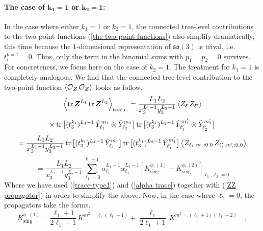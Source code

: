 \paragraph[The case of $k_1 = 1$ or $k_2 = 1$]{The case of $\mathbf{k_1 = 1}$ or $\mathbf{k_2 = 1}$:}
In the case where either $k_1 = 1$ or $k_2 = 1$, the connected tree-level contributions to the two-point functions (\ref{the two-point functions}) also simplify dramatically, this time because the $1$-dimensional representation of $\mathfrak{so}(3)$ is trival, i.e. $t_i^{k=1} = 0$. Thus, only the term in the binomial sums with $p_1 = p_2 = 0$ survives. For concreteness, we focus here on the case of $k_2=1$. The treatment for $k_1=1$ is completely analogous. We find that the connected tree-level contribution to the two-point function $\expval{\mathcal{O}_{\boldsymbol{Z}} \, \mathcal{O}_{\boldsymbol{Z}}}$ looks as follow.
%
%
\begin{equation*}
\expval{\tr \boldsymbol{Z}^{L_1} \tr \boldsymbol{Z}^{L_2}}_{\mathrm{tree,c.}}
=
\frac{L_1 L_2}{x_3^{L_1-1} y_3^{L_2-1}}
\expval{
Z_{\boldsymbol{\ell}} \,
Z_{\boldsymbol{\ell}'}
}
\end{equation*}
%
%
\begin{equation*}
\times
\tr \big[ (t_3^{k_1})^{L_1 - 1} \, \hat{Y}_{\ell_1}^{m_1} \otimes \hat{Y}_{\ell_2}^{m_2} \big] 
\tr \big[ (t_3^{k_1})^{L_2 - 1} \, \hat{Y}_{\ell_1'}^{m_1'} \otimes \hat{Y}_{\ell_2'}^{m_2'} \big]
\end{equation*}
%
%
\begin{equation*}
= \frac{L_1 L_2}{x_3^{L_1-1} y_3^{L_2-1}}
\tr \big[ (t_3^{k_1})^{L_1 - 1} \, \hat{Y}_{\ell_1}^{m_1} \big] 
\tr \big[ (t_3^{k_1})^{L_2 - 1} \, \hat{Y}_{\ell_1'}^{m_1'} \big]
\expval{
Z_{\ell_1,m_1;0,0} \,
Z_{\ell_1',m_1';0,0}
}
\end{equation*}
%
%
\begin{equation}\label{two-point function so(3)}
= \frac{L_1 L_2}{x_3^{L_1-1} y_3^{L_2-1}}
\sum_{\ell_1 = 0}^{k_1 - 1}
\alpha_{\ell_1}^{L_1 - 1}
\alpha_{\ell_1}^{L_2 - 1}
\left[
K^{\phi,(1)}_{\mathrm{sing}}
-
K^{\phi,(2)}_{\mathrm{sing}}
\right]_{\ell_1, \ell_2 = 0}
\end{equation}
%
%
Where we have used (\ref{trace-type1}) and (\ref{alpha trace}) together with (\ref{ZZ propagotor}) in order to simplify the above. Now, in the case where $\ell_2 = 0$, the propagators take the forms.
%
%
\begin{equation*}
K^{\phi,(1)}_{\mathrm{sing}}
=
\frac{\ell_1 + 1}{2 \ell_1 + 1} \, K^{m^2 = \ell_1 (\ell_1 - 1)}
+
\frac{\ell_1}{2 \ell_1 + 1} \, K^{m^2 = (\ell_1 + 1) (\ell_1 + 2)}
%
\quad ,
\end{equation*}
